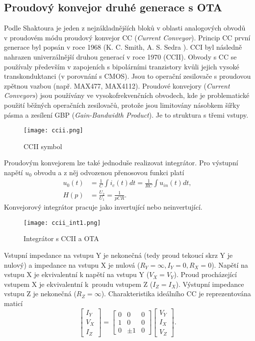 \subsection{Proudový konvejor druhé generace s OTA}
Podle Shaktoura \cite{15} je jeden z nejzákladnějších bloků v oblasti analogových obvodů v proudovém módu proudový konvejor CC (\textit{Current Conveyor}). Princip CC první generace byl popsán v roce 1968 (K. C. Smith, A. S. Sedra \cite{16}). CCI byl následně nahrazen univerzálnější druhou generací v roce 1970 (CCII)\cite{17}. Obvody s CC se používaly především v zapojeních s bipolárními tranzistory kvůli jejich vysoké transkonduktanci (v porovnání s CMOS). Jsou to operační zesilovače s proudovou zpětnou vazbou (např. MAX477, MAX4112). Proudové konvejory (\textit{Current Conveyors}) jsou používány ve vysokofrekvenčních obvodech, kde je problematické použití běžných operačních zesilovačů, protože jsou limitovány násobkem šířky pásma a zesílení GBP (\textit{Gain-Bandwidth Product}). Je to struktura s třemi vstupy.
\begin{figure}[h]
\centering
\texttt{[image: ccii.png]}
\caption[CCII symbol]{CCII symbol \cite{15}}
\end{figure}
\noindent Proudovým konvejorem lze také jednoduše realizovat integrátor. Pro výstupní napětí $u_0$ obvodu a z něj odvozenou přenosovou funkci platí
\begin{align}
u_0(t) &= \frac{1}{C}\int i_c(t)dt = \frac{1}{RC}\int u_{in}(t)dt, \\
H(p) &= \frac{U_2}{U_1} = \frac{1}{pCR}.
\end{align}
\noindent Konvejorový integrátor pracuje jako invertující nebo neinvertující.
\begin{figure}[h]
\centering
\texttt{[image: ccii\_int1.png]}
\caption[Integrátor s CCII a OTA]{Integrátor s CCII a OTA \cite{12}}
\end{figure}
\noindent Vstupní impedance na vstupu Y je nekonečná (tedy proud tekoucí skrz Y je nulový) a impedance na vstupu X je nulová ($R_Y = \infty, I_Y = 0, R_X = 0$). Napětí na vstupu X je ekvivalentní k napětí na vstupu Y ($V_X = V_Y$). Proud procházející vstupem X je ekvivalentní k~proudu vstupem Z ($I_Z = I_X$). Výstupní impedance vstupu Z je nekonečná ($R_Z = \infty$).
Charakteristika ideálního CC je reprezentována maticí
\begin{equation}
\begin{bmatrix}
I_Y \\ V_X \\ I_Z
\end{bmatrix}
=
\begin{bmatrix}
0 & 0 & 0 \\
1 & 0 & 0 \\
0 & \pm 1 & 0 
\end{bmatrix}
\begin{bmatrix}
V_Y \\
I_X \\
V_Z
\end{bmatrix}.
\end{equation}
